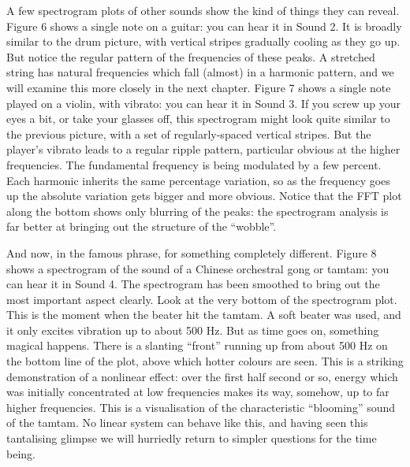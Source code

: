   A few spectrogram plots of other sounds show the kind of things they can 
  reveal. Figure 6 shows a single note on a guitar: you can hear it in Sound 2. 
  It is broadly similar to the drum picture, with vertical stripes gradually 
  cooling as they go up. But notice the regular pattern of the frequencies of 
  these peaks. A stretched string has natural frequencies which fall (almost) 
  in a harmonic pattern, and we will examine this more closely in the next 
  chapter. Figure 7 shows a single note played on a violin, with vibrato: you 
  can hear it in Sound 3. If you screw up your eyes a bit, or take your glasses 
  off, this spectrogram might look quite similar to the previous picture, with 
  a set of regularly-spaced vertical stripes. But the player's vibrato leads to 
  a regular ripple pattern, particular obvious at the higher frequencies. The 
  fundamental frequency is being modulated by a few percent. Each harmonic 
  inherits the same percentage variation, so as the frequency goes up the 
  absolute variation gets bigger and more obvious. Notice that the FFT plot 
  along the bottom shows only blurring of the peaks: the spectrogram analysis 
  is far better at bringing out the structure of the ``wobble''. 


\audio{}


\audio{}

  And now, in the famous phrase, for something completely different. Figure 8 
  shows a spectrogram of the sound of a Chinese orchestral gong or tamtam: you 
  can hear it in Sound 4. The spectrogram has been smoothed to bring out the 
  most important aspect clearly. Look at the very bottom of the spectrogram 
  plot. This is the moment when the beater hit the tamtam. A soft beater was 
  used, and it only excites vibration up to about 500 Hz. But as time goes on, 
  something magical happens. There is a slanting ``front'' running up from 
  about 500 Hz on the bottom line of the plot, above which hotter colours are 
  seen. This is a striking demonstration of a nonlinear effect: over the first 
  half second or so, energy which was initially concentrated at low frequencies 
  makes its way, somehow, up to far higher frequencies. This is a visualisation 
  of the characteristic ``blooming'' sound of the tamtam. No linear system can 
  behave like this, and having seen this tantalising glimpse we will hurriedly 
  return to simpler questions for the time being. 


\audio{}

